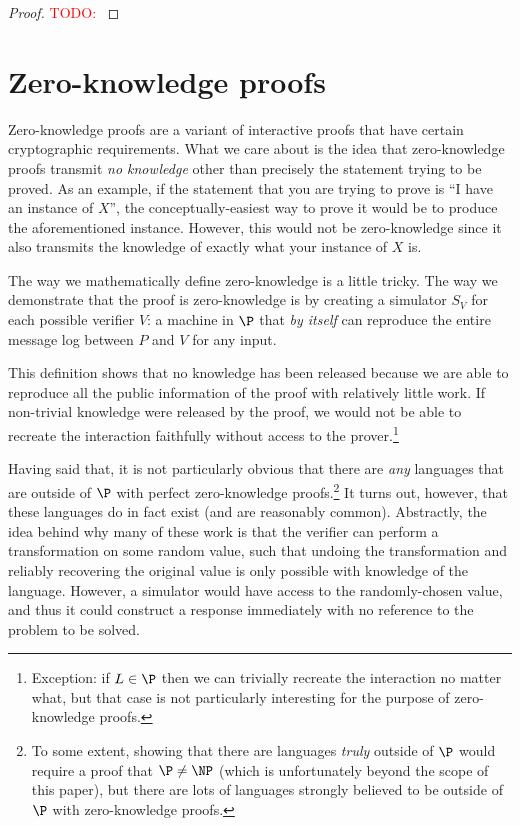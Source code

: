 \documentclass[english,12pt]{reedthesis}
\theoremstyle{plain}
\theoremstyle{definition}
\theoremstyle{remark}
\newcommand{\TODO}[1]{\textcolor{red}{TODO: #1}}
\begin{document}
\begin{proof}
  \TODO{}
\end{proof}

\section{Zero-knowledge proofs}\label{sec:zero-knowledge}

Zero-knowledge proofs are a variant of interactive proofs that have certain
cryptographic requirements. What we care about is the idea that zero-knowledge
proofs transmit \emph{no knowledge} other than precisely the statement trying to
be proved. As an example, if the statement that you are trying to prove is ``I
have an instance of $X$'', the conceptually-easiest way to prove it would be to
produce the aforementioned instance. However, this would not be zero-knowledge
since it also transmits the knowledge of exactly what your instance of $X$ is.

The way we mathematically define zero-knowledge is a little tricky. The way we
demonstrate that the proof is zero-knowledge is by creating a simulator $S_{V}$
for each possible verifier $V$: a machine in $\P$ that \emph{by itself} can
reproduce the entire message log between $P$ and $V$ for any input.

This definition shows that no knowledge has been released because we are able to
reproduce all the public information of the proof with relatively little work.
If non-trivial knowledge were released by the proof, we would not be able to
recreate the interaction faithfully without access to the
prover.\footnote{Exception: if $L \in \P$ then we can trivially recreate the
  interaction no matter what, but that case is not particularly interesting for
  the purpose of zero-knowledge proofs.}

Having said that, it is not particularly obvious that there are \emph{any}
languages that are outside of $\P$ with perfect zero-knowledge
proofs.\footnote{To some extent, showing that there are languages \emph{truly}
  outside of $\P$ would require a proof that $\P \ne \NP$ (which is unfortunately
  beyond the scope of this paper), but there are lots of languages strongly
  believed to be outside of $\P$ with zero-knowledge proofs.} It turns out,
however, that these languages do in fact exist (and are reasonably common).
Abstractly, the idea behind why many of these work is that the verifier can
perform a transformation on some random value, such that undoing the
transformation and reliably recovering the original value is only possible with
knowledge of the language. However, a simulator would have access to the
randomly-chosen value, and thus it could construct a response immediately with
no reference to the problem to be solved.
\end{document}
